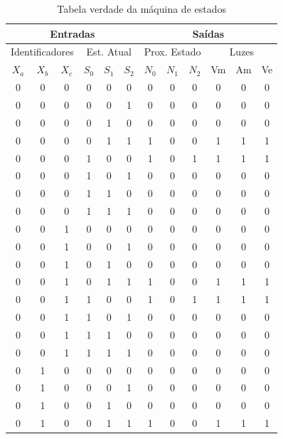 \documentclass[12pt,a4paper]{article}
\begin{document}
\begin{longtable}{|ccc|ccc||ccc|c|c|c|}
\caption{Tabela verdade da máquina de estados} \label{tabV}\\

\hline
\multicolumn{6}{|c||}{\textbf{Entradas}} & \multicolumn{6}{|c|}{\textbf{Saídas}} \\ \hline
\multicolumn{3}{|c|}{Identificadores} & \multicolumn{3}{|c||}{Est. Atual} & \multicolumn{3}{|c|}{Prox. Estado} & \multicolumn{3}{|c|}{Luzes} \\ \hline
$X_a$ & $X_b$ & $X_c$ & $S_0$ & $S_1$ & $S_2$ & $N_0$ & $N_1$ & $N_2$ & Vm & Am & Ve \\ \hline \endhead
0 & 0 & 0 & 0 & 0 & 0 & 0 & 0 & 0 & 0 & 0 & 0 \\ \hline
0 & 0 & 0 & 0 & 0 & 1 & 0 & 0 & 0 & 0 & 0 & 0 \\ \hline
0 & 0 & 0 & 0 & 1 & 0 & 0 & 0 & 0 & 0 & 0 & 0 \\ \hline
0 & 0 & 0 & 0 & 1 & 1 & 1 & 0 & 0 & 1 & 1 & 1 \\ \hline
0 & 0 & 0 & 1 & 0 & 0 & 1 & 0 & 1 & 1 & 1 & 1 \\ \hline
0 & 0 & 0 & 1 & 0 & 1 & 0 & 0 & 0 & 0 & 0 & 0 \\ \hline
0 & 0 & 0 & 1 & 1 & 0 & 0 & 0 & 0 & 0 & 0 & 0 \\ \hline
0 & 0 & 0 & 1 & 1 & 1 & 0 & 0 & 0 & 0 & 0 & 0 \\ \hline
0 & 0 & 1 & 0 & 0 & 0 & 0 & 0 & 0 & 0 & 0 & 0 \\ \hline
0 & 0 & 1 & 0 & 0 & 1 & 0 & 0 & 0 & 0 & 0 & 0 \\ \hline
0 & 0 & 1 & 0 & 1 & 0 & 0 & 0 & 0 & 0 & 0 & 0 \\ \hline
0 & 0 & 1 & 0 & 1 & 1 & 1 & 0 & 0 & 1 & 1 & 1 \\ \hline
0 & 0 & 1 & 1 & 0 & 0 & 1 & 0 & 1 & 1 & 1 & 1 \\ \hline
0 & 0 & 1 & 1 & 0 & 1 & 0 & 0 & 0 & 0 & 0 & 0 \\ \hline
0 & 0 & 1 & 1 & 1 & 0 & 0 & 0 & 0 & 0 & 0 & 0 \\ \hline
0 & 0 & 1 & 1 & 1 & 1 & 0 & 0 & 0 & 0 & 0 & 0 \\ \hline
0 & 1 & 0 & 0 & 0 & 0 & 0 & 0 & 0 & 0 & 0 & 0 \\ \hline
0 & 1 & 0 & 0 & 0 & 1 & 0 & 0 & 0 & 0 & 0 & 0 \\ \hline
0 & 1 & 0 & 0 & 1 & 0 & 0 & 0 & 0 & 0 & 0 & 0 \\ \hline
0 & 1 & 0 & 0 & 1 & 1 & 1 & 0 & 0 & 1 & 1 & 1 \\ \hline

\end{longtable}
\end{document}
